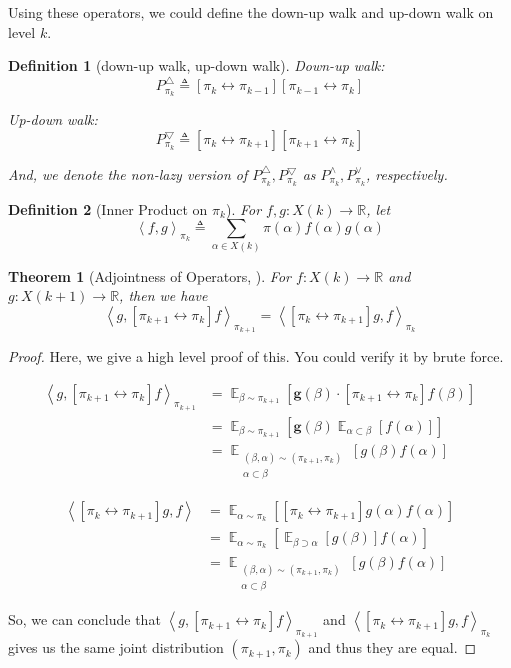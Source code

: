 \documentclass{article}
\newtheorem{define}{Definition}[section]
\newtheorem{theorem}{Theorem}[section]
\DeclareMathOperator*{\E}{\mathbb{E}}
\def\Op#1#2{\left[#1 \leftrightarrow #2\right]}
\def\<{\left\langle}
\def\>{\right\rangle}
\begin{document}
Using these operators, we could define the down-up walk and up-down walk on level $k$.
\begin{define}[down-up walk, up-down walk]
  
  Down-up walk:
  \[P_{\pi_k}^{\bigtriangleup} \triangleq \Op{\pi_k}{\pi_{k-1}} \Op{\pi_{k-1}}{\pi_k}\]

  Up-down walk:
  \[P_{\pi_k}^{\bigtriangledown} \triangleq \Op{\pi_k}{\pi_{k+1}} \Op{\pi_{k+1}}{\pi_k}\]

  And, we denote the non-lazy version of $P_{\pi_k}^\bigtriangleup, P_{\pi_k}^\bigtriangledown$ as $P_{\pi_k}^\land, P_{\pi_k}^\lor$, respectively.
\end{define}

\begin{define}[Inner Product on $\pi_k$]
  For $f, g: X(k) \to \mathbb{R}$, let
  \[\< f, g \>_{\pi_k} \triangleq \sum_{\alpha\in X(k)}\pi(\alpha) f(\alpha) g(\alpha)\]
\end{define}

\begin{theorem}[Adjointness of Operators, \cite{alev2020improved}]
  For $f: X(k) \to \mathbb{R}$ and $g: X(k+1) \to \mathbb{R}$, then we have
  \[\< g, \Op{\pi_{k+1}}{\pi_k} f\>_{\pi_{k+1}} = \<\Op{\pi_k}{\pi_{k+1}} g, f\>_{\pi_k}\]
\end{theorem}
\begin{proof}
  Here, we give a high level proof of this. You could verify it by brute force.

  \begin{align*}
    \<g, \Op{\pi_{k+1}}{\pi_k} f\>_{\pi_{k+1}}
    &= \E_{\beta\sim \pi_{k+1}}[\mathbf{g}(\beta) \cdot \Op{\pi_{k+1}}{\pi_k}f(\beta)] \\
    &= \E_{\beta\sim \pi_{k+1}}[\mathbf{g}(\beta) \E_{\alpha\subset \beta} [f(\alpha)]] \\
    &= \E_{\substack{(\beta, \alpha)\sim (\pi_{k+1}, \pi_k)\\ \alpha\subset\beta}}[g(\beta)f(\alpha)]
  \end{align*} 

  \begin{align*}
    \<\Op{\pi_k}{\pi_{k+1}} g, f\>
    &= \E_{\alpha\sim\pi_k}[\Op{\pi_k}{\pi_{k+1}}g(\alpha)f(\alpha)] \\
    &= \E_{\alpha\sim\pi_k}[\E_{\beta\supset\alpha}[g(\beta)]f(\alpha)] \\
    &= \E_{\substack{(\beta, \alpha)\sim (\pi_{k+1}, \pi_k)\\ \alpha\subset\beta}}[g(\beta)f(\alpha)]
  \end{align*}

  So, we can conclude that $\<g, \Op{\pi_{k+1}}{\pi_k}f\>_{\pi_{k+1}}$ and $\<\Op{\pi_k}{\pi_{k+1}}g, f\>_{\pi_k}$ gives us the same joint distribution $(\pi_{k+1}, \pi_k)$ and thus they are equal.
\end{proof}
\end{document}
